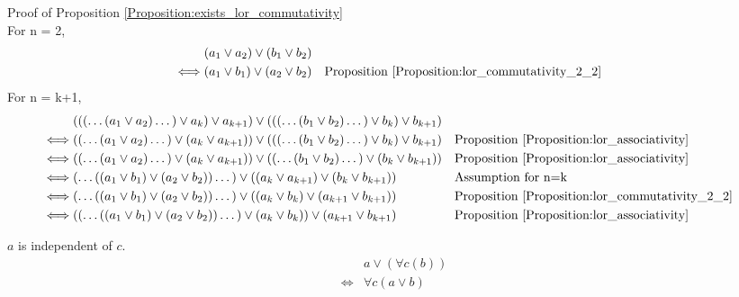 Proof of Proposition \ref{Proposition:exists_lor_commutativity} \\
For n = 2,
\begin{align*}
& (a_1 \lor a_2) \lor (b_1 \lor b_2) \\
\iff & (a_1 \lor b_1) \lor (a_2 \lor b_2)
& & \text{Proposition \ref{Proposition:lor_commutativity_2_2}} \\
\end{align*}
For n = k+1,
\begin{align*}
& ((( \dots (a_1 \lor a_2) \dots ) \lor a_k) \lor a_{k+1}) \lor ((( \dots (b_1 \lor b_2) \dots ) \lor b_k ) \lor b_{k+1}) \\
\iff & (( \dots (a_1 \lor a_2) \dots ) \lor (a_k \lor a_{k+1})) \lor ((( \dots (b_1 \lor b_2) \dots ) \lor b_k ) \lor b_{k+1})
& & \text{Proposition \ref{Proposition:lor_associativity}} \\
\iff & (( \dots (a_1 \lor a_2) \dots ) \lor (a_k \lor a_{k+1})) \lor (( \dots (b_1 \lor b_2) \dots ) \lor (b_k \lor b_{k+1}))
& & \text{Proposition \ref{Proposition:lor_associativity}} \\
\iff & ( \dots ((a_1 \lor b_1) \lor (a_2 \lor b_2)) \dots ) \lor ((a_k \lor a_{k+1}) \lor (b_k \lor b_{k+1}))
& & \text{Assumption for n=k} \\
\iff & ( \dots ((a_1 \lor b_1) \lor (a_2 \lor b_2)) \dots ) \lor ((a_k \lor b_k) \lor (a_{k+1} \lor b_{k+1}))
& & \text{Proposition \ref{Proposition:lor_commutativity_2_2}} \\
\iff & (( \dots ((a_1 \lor b_1) \lor (a_2 \lor b_2)) \dots ) \lor (a_k \lor b_k)) \lor (a_{k+1} \lor b_{k+1})
& & \text{Proposition \ref{Proposition:lor_associativity}} \\
\end{align*}

\begin{prop}
\label{Proposition:lor_forall_distributivity}
$a$ is independent of $c$.
\begin{align*}
& a \lor (\forall c (b)) \\
\iff & \forall c (a \lor b)
\end{align*}
\end{prop}

